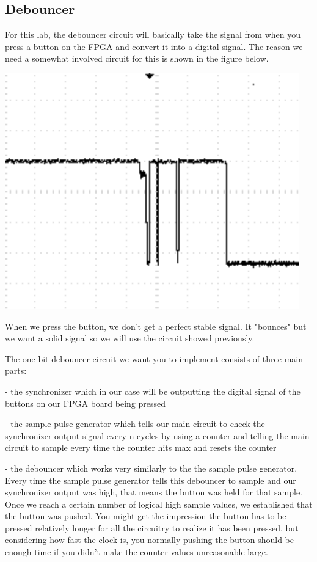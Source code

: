 \documentclass[11pt]{article}
\begin{document}
\subsection{Debouncer}

For this lab, the debouncer circuit will basically take the signal from when you press a button on the FPGA and convert it into a digital signal. The reason we need a somewhat involved circuit for this is shown in the figure below.

\includegraphics[width=\textwidth]{images/lab2_fig4.png}

When we press the button, we don't get a perfect stable signal. It "bounces" but we want a solid signal so we will use the circuit showed previously.

The one bit debouncer circuit we want you to implement consists of three main parts:

- the synchronizer which in our case will be outputting the digital signal of the buttons on our FPGA board being pressed

- the sample pulse generator which tells our main circuit to check the synchronizer output signal every n cycles by using a counter and telling the main circuit to sample every time the counter hits max and resets the counter

- the debouncer which works very similarly to the the sample pulse generator. Every time the sample pulse generator tells this debouncer to sample and our synchronizer output was high, that means the button was held for that sample. Once we reach a certain number of logical high sample values, we established that the button was pushed. You might get the impression the button has to be pressed relatively longer for all the circuitry to realize it has been pressed, but considering how fast the clock is, you normally pushing the button should be enough time if you didn't make the counter values unreasonable large.
\end{document}
